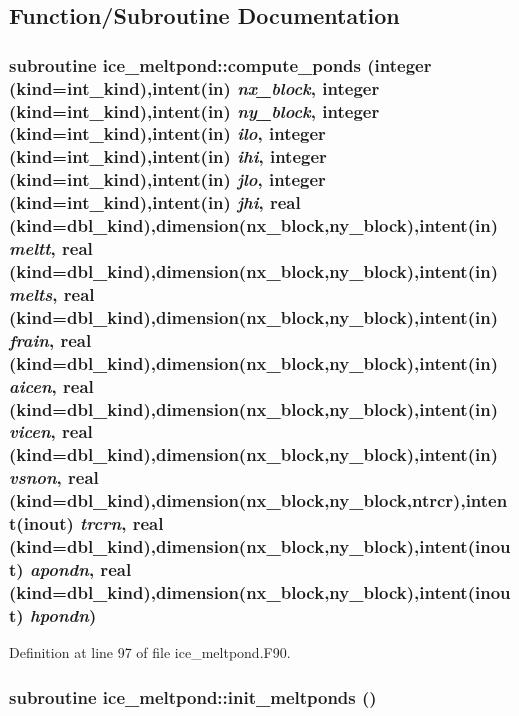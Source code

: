 \subsection{Function/Subroutine Documentation}
\hypertarget{namespaceice__meltpond_a2d66a4a7c6f08732259cd3bd80998c9a}{
\subsubsection[{compute\_\-ponds}]{\setlength{\rightskip}{0pt plus 5cm}subroutine ice\_\-meltpond::compute\_\-ponds (integer (kind=int\_\-kind),intent(in) {\em nx\_\-block}, \/  integer (kind=int\_\-kind),intent(in) {\em ny\_\-block}, \/  integer (kind=int\_\-kind),intent(in) {\em ilo}, \/  integer (kind=int\_\-kind),intent(in) {\em ihi}, \/  integer (kind=int\_\-kind),intent(in) {\em jlo}, \/  integer (kind=int\_\-kind),intent(in) {\em jhi}, \/  real (kind=dbl\_\-kind),dimension(nx\_\-block,ny\_\-block),intent(in) {\em meltt}, \/  real (kind=dbl\_\-kind),dimension(nx\_\-block,ny\_\-block),intent(in) {\em melts}, \/  real (kind=dbl\_\-kind),dimension(nx\_\-block,ny\_\-block),intent(in) {\em frain}, \/  real (kind=dbl\_\-kind),dimension(nx\_\-block,ny\_\-block),intent(in) {\em aicen}, \/  real (kind=dbl\_\-kind),dimension(nx\_\-block,ny\_\-block),intent(in) {\em vicen}, \/  real (kind=dbl\_\-kind),dimension(nx\_\-block,ny\_\-block),intent(in) {\em vsnon}, \/  real (kind=dbl\_\-kind),dimension(nx\_\-block,ny\_\-block,ntrcr),intent(inout) {\em trcrn}, \/  real (kind=dbl\_\-kind),dimension(nx\_\-block,ny\_\-block),intent(inout) {\em apondn}, \/  real (kind=dbl\_\-kind),dimension(nx\_\-block,ny\_\-block),intent(inout) {\em hpondn})}}
\label{namespaceice__meltpond_a2d66a4a7c6f08732259cd3bd80998c9a}


Definition at line 97 of file ice\_\-meltpond.F90.\hypertarget{namespaceice__meltpond_ac0d35a10ba7a39add524e51b1964a451}{
\subsubsection[{init\_\-meltponds}]{\setlength{\rightskip}{0pt plus 5cm}subroutine ice\_\-meltpond::init\_\-meltponds ()}}
\label{namespaceice__meltpond_ac0d35a10ba7a39add524e51b1964a451}


